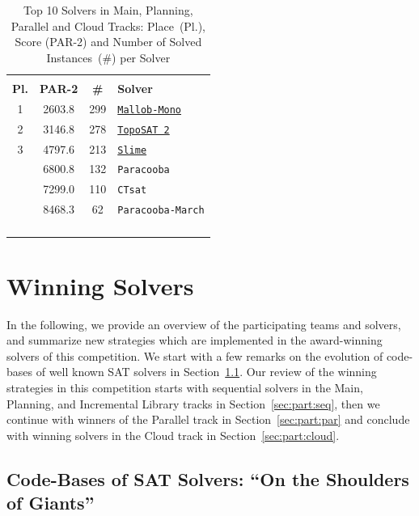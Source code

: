 \documentclass{elsarticle}
\newcommand{\solver}[1]{\texttt{#1}}
\newcommand{\solbert}[1]{\underline{\solver{#1}}}
\begin{document}
\begin{table}
\begin{tabularx}{.5\linewidth}{cccX}
\arrayrulecolor{lightgray}
\multicolumn{4}{l}{\bf Cloud Track}\\
\bf Pl. & \bf PAR-2 & \bf \# & \bf Solver \\
\hline
 1 & 2603.8 & 299 & \solbert{Mallob-Mono} \\
 2 & 3146.8 & 278 & \solbert{TopoSAT 2} \\
 3 & 4797.6 & 213 & \solbert{Slime} \\
   & 6800.8 & 132 & \solver{Paracooba} \\
   & 7299.0 & 110 & \solver{CTsat} \\
   & 8468.3 & \phantom{0}62 & \solver{Paracooba-March} \\
\phantom{0} & \phantom{0} & \phantom{0} & \phantom{0}\\
\phantom{0} & \phantom{0} & \phantom{0} & \phantom{0}\\
\phantom{0} & \phantom{0} & \phantom{0} & \phantom{0}\\
\phantom{0} & \phantom{0} & \phantom{0} & \phantom{0}
\end{tabularx}
\caption{Top 10 Solvers in Main, Planning, Parallel and Cloud Tracks: Place~(Pl.), Score (PAR-2) and Number of Solved Instances~(\#) per Solver}
\label{tab:results}
\end{table}


\section{Winning Solvers}
\label{sec:winners}

In the following, we provide an overview of the participating teams and solvers, 
and summarize new strategies which are implemented in the award-winning solvers of this competition. 
We start with a few remarks on the evolution of code-bases of well known SAT solvers in Section~\ref{sec:codebases}. 
Our review of the winning strategies in this competition starts with sequential solvers in the Main, Planning, and Incremental Library tracks in Section~\ref{sec:part:seq},
then we continue with winners of the Parallel track in Section~\ref{sec:part:par} and conclude with winning solvers in the Cloud track in Section~\ref{sec:part:cloud}. 


\subsection{Code-Bases of SAT Solvers: ``On the Shoulders of Giants''}
\label{sec:codebases}
\end{document}

